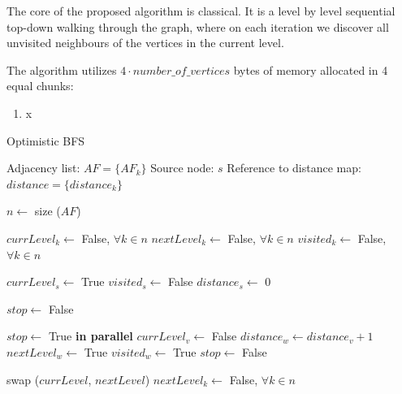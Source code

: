 \documentclass[letterpaper]{article}
\begin{document}
			The core of the proposed algorithm is classical. 
			It is a level by level sequential top-down walking through the graph, where on each iteration we discover all unvisited neighbours of the vertices in the current level.
			
			The algorithm utilizes $4 \cdot number\_of\_vertices$ bytes of memory allocated in 4 equal chunks:
			\begin{enumerate}
				\item x
			\end{enumerate}
			
			
			\begin{algorithm}
				\caption{Optimistic BFS}
				\begin{algorithmic}[1]
					\Require
						\Statex Adjacency list: $AF = \lbrace AF_k \rbrace$
						\Statex Source node: $s$
						\Statex Reference to distance map: $distance = \lbrace distance_k \rbrace$
					\Statex

					\State $n \gets$ size ($AF$) 					
					
					\State $currLevel_k \gets$ False, $\forall k \in n$
					\State $nextLevel_k \gets$ False, $\forall k \in n$
					\State $visited_k \gets$ False, $\forall k \in n$
					\Statex
					
					\State $currLevel_s \gets$ True
					\State $visited_s \gets$ False
					\State $distance_s \gets$ 0
					\Statex
					
					\State $stop \gets$ False
					\Statex
					
						\State $stop\gets$ True
						 \textbf{in parallel}
								\State $currLevel_v \gets$ False
										\State $distance_w \gets distance_v + 1$
										\State $nextLevel_w \gets$ True
										\State $visited_w \gets$ True
										\State $stop \gets$ False
									\EndIf
								\EndFor
							\EndIf
						\EndFor
						
						\vspace{-0.051cm} %
						
						\State swap ($currLevel$, $nextLevel$)
						\State $nextLevel_k \gets$ False, $\forall k\in n$
					\EndWhile
				\end{algorithmic}
			\end{algorithm}


						
			
\end{document}

